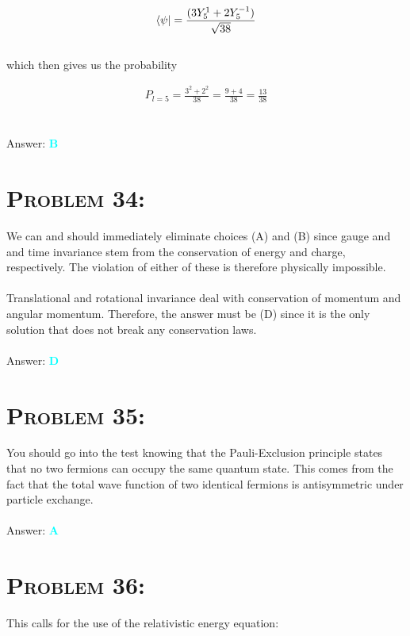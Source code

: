 \documentclass{article}
\begin{document}
\begin{gather}
\bra{\psi} = \frac{(3 Y^{1}_{5} + 2Y^{-1}_{5})}{\sqrt{38}}\nonumber
\end{gather}
\\
which then gives us the probability

\begin{gather}
P_{l=5} = \frac{3^{2} + 2^{2}}{38} = \frac{9 + 4}{38} = \boxed{\frac{13}{38}}\nonumber
\end{gather}
\\\\
Answer: \textbf{\textcolor{cyan}B}\\


\section{\textsc{Problem 34:}} We can and should immediately eliminate choices (A) and (B) since gauge and and time invariance stem from the conservation of energy and charge, respectively. The violation of either of these is therefore physically impossible. \\
\\
Translational and rotational invariance deal with conservation of momentum and angular momentum. Therefore, the answer must be (D) since it is the only solution that does not break any conservation laws.
\\\\
Answer: \textbf{\textcolor{cyan}D}\\


\section{\textsc{Problem 35:}} You should go into the test knowing that the Pauli-Exclusion principle states that no two fermions can occupy the same quantum state. This comes from the fact that the total wave function of two identical fermions is antisymmetric under particle exchange. 
\\\\
Answer: \textbf{\textcolor{cyan}A}\\


\section{\textsc{Problem 36:}} This calls for the use of the relativistic energy equation:
\end{document}

